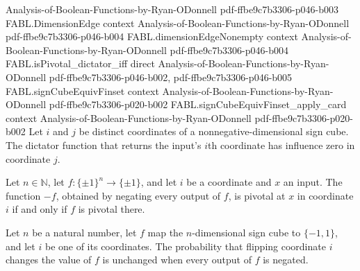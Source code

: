 \begin{theorem}
  {Analysis-of-Boolean-Functions-by-Ryan-ODonnell}
  {pdf-ffbe9c7b3306-p046-b003}
\proofstep
  {FABL.DimensionEdge}
  {context}
  {Analysis-of-Boolean-Functions-by-Ryan-ODonnell}
  {pdf-ffbe9c7b3306-p046-b004}
\proofstep
  {FABL.dimensionEdgeNonempty}
  {context}
  {Analysis-of-Boolean-Functions-by-Ryan-ODonnell}
  {pdf-ffbe9c7b3306-p046-b004}
\proofstep
  {FABL.isPivotal_dictator_iff}
  {direct}
  {Analysis-of-Boolean-Functions-by-Ryan-ODonnell}
  {pdf-ffbe9c7b3306-p046-b002,
    pdf-ffbe9c7b3306-p046-b005}
\proofstep
  {FABL.signCubeEquivFinset}
  {context}
  {Analysis-of-Boolean-Functions-by-Ryan-ODonnell}
  {pdf-ffbe9c7b3306-p020-b002}
\proofstep
  {FABL.signCubeEquivFinset_apply_card}
  {context}
  {Analysis-of-Boolean-Functions-by-Ryan-ODonnell}
  {pdf-ffbe9c7b3306-p020-b002}
Let $i$ and $j$ be distinct coordinates of a nonnegative-dimensional sign cube. The
dictator function that returns the input's $i$th coordinate has influence zero in
coordinate $j$.
\end{theorem}

\begin{theorem}
\label{FABL.isPivotal_neg_iff}
\leanok
{}
Let $n\in\mathbb N$, let $f:\{\pm1\}^n\to\{\pm1\}$, and let $i$ be a coordinate and $x$
an input. The function $-f$, obtained by negating every output of $f$, is pivotal at $x$
in coordinate $i$ if and only if $f$ is pivotal there.
\end{theorem}

\begin{theorem}
\label{FABL.booleanInfluence_neg}
\leanok
{}
Let $n$ be a natural number, let $f$ map the $n$-dimensional sign cube to $\{−1,1\}$,
and let $i$ be one of its coordinates. The probability that flipping coordinate $i$
changes the value of $f$ is unchanged when every output of $f$ is negated.
\end{theorem}

